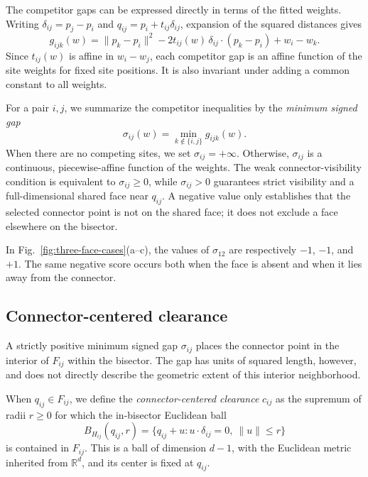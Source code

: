 The competitor gaps can be expressed directly in terms of the fitted weights. Writing $\delta_{ij}=p_j-p_i$ and $q_{ij}=p_i+t_{ij}\delta_{ij}$, expansion of the squared distances gives
\begin{equation}
g_{ijk}(w)=
\|p_k-p_i\|^2
-2t_{ij}(w)\,\delta_{ij}\cdot(p_k-p_i)
+w_i-w_k.
\label{eq:gap-affine-formula}
\end{equation}
Since $t_{ij}(w)$ is affine in $w_i-w_j$, each competitor gap is an affine function of the site weights for fixed site positions. It is also invariant under adding a common constant to all weights.

For a pair $i,j$, we summarize the competitor inequalities by the \emph{minimum signed gap}
\begin{equation}
\boxed{\sigma_{ij}(w)=\min_{k\notin\{i,j\}}g_{ijk}(w).}
\label{eq:minimum-signed-gap}
\end{equation}
When there are no competing sites, we set $\sigma_{ij}=+\infty$. Otherwise, $\sigma_{ij}$ is a continuous, piecewise-affine function of the weights. The weak connector-visibility condition is equivalent to $\sigma_{ij}\ge0$, while $\sigma_{ij}>0$ guarantees strict visibility and a full-dimensional shared face near $q_{ij}$. A negative value only establishes that the selected connector point is not on the shared face; it does not exclude a face elsewhere on the bisector.

In Fig.~\ref{fig:three-face-cases}(a--c), the values of $\sigma_{12}$ are respectively $-1$, $-1$, and $+1$. The same negative score occurs both when the face is absent and when it lies away from the connector.

\subsection{Connector-centered clearance}
\label{subsec:connector-clearance}

A strictly positive minimum signed gap $\sigma_{ij}$ places the connector point in the interior of $F_{ij}$ within the bisector. The gap has units of squared length, however, and does not directly describe the geometric extent of this interior neighborhood.

When $q_{ij}\in F_{ij}$, we define the \emph{connector-centered clearance} $c_{ij}$ as the supremum of radii $r\ge0$ for which the in-bisector Euclidean ball
\begin{equation}
B_{H_{ij}}(q_{ij},r)
=\{q_{ij}+u:
u\cdot\delta_{ij}=0,\ \|u\|\le r\}
\label{eq:bisector-ball}
\end{equation}
is contained in $F_{ij}$. This is a ball of dimension $d-1$, with the Euclidean metric inherited from $\mathbb R^d$, and its center is fixed at $q_{ij}$.


